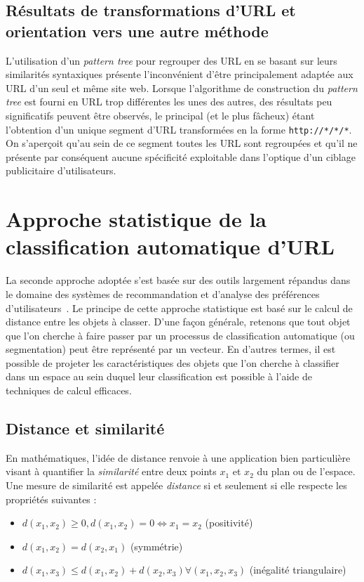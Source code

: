 \documentclass[11pt, a4paper]{article}
\begin{document}
\subsection{Résultats de transformations d'URL et orientation vers une autre méthode}

L'utilisation d'un \textit{pattern tree} pour regrouper des URL en se basant sur leurs similarités syntaxiques présente l'inconvénient d'être principalement adaptée aux URL d'un seul et même site web. Lorsque l'algorithme de construction du \textit{pattern tree} est fourni en URL trop différentes les unes des autres, des résultats peu significatifs peuvent être observés, le principal (et le plus fâcheux) étant l'obtention d'un unique segment d'URL transformées en la forme \texttt{http://*/*/*}. On s'aperçoit qu'au sein de ce segment toutes les URL sont regroupées et qu'il ne présente par conséquent aucune spécificité exploitable dans l'optique d'un ciblage publicitaire d'utilisateurs.

\section{Approche statistique de la classification automatique d'URL}

La seconde approche adoptée s'est basée sur des outils largement répandus dans le domaine des systèmes de recommandation et d'analyse des préférences d'utilisateurs~\cite{morichetta}. Le principe de cette approche statistique est basé sur le calcul de distance entre les objets à classer. D'une façon générale, retenons que tout objet que l'on cherche à faire passer par un processus de classification automatique (ou segmentation) peut être représenté par un vecteur. En d'autres termes, il est possible de projeter les caractéristiques des objets que l'on cherche à classifier dans un espace au sein duquel leur classification est possible à l'aide de techniques de calcul efficaces.

\subsection{Distance et similarité}

En mathématiques, l'idée de distance renvoie à une application bien particulière visant à quantifier la \textit{similarité} entre deux points $x_1$ et $x_2$ du plan ou de l'espace. Une mesure de similarité est appelée \textit{distance} si et seulement si elle respecte les propriétés suivantes :

\begin{itemize}
	\item $d(x_1, x_2) \geq 0, d(x_1, x_2) = 0 \iff x_1 = x_2$ (positivité)
	\item $d(x_1, x_2) = d(x_2, x_1)$ (symmétrie)
	\item $d(x_1, x_3) \leq d(x_1, x_2) + d(x_2, x_3) \forall (x_1, x_2, x_3)$ (inégalité triangulaire)
\end{itemize}
\end{document}
